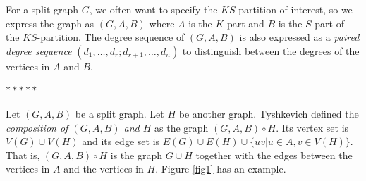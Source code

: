 \documentclass[11pt]{article}
\begin{document}
	For a split graph $G$, we often want to specify the $KS$-partition of interest,  so we express the graph as $(G,A, B)$ where $A$ is the $K$-part and $B$ is the $S$-part of the $KS$-partition.  The degree sequence of $(G,A,B)$ is also expressed as a {\it paired degree sequence} $(d_1, \hdots, d_r; d_{r+1}, \hdots, d_n)$ to distinguish between the degrees of the vertices in $A$ and $B$. 
	
	
	
	
	
\medskip	
\bigskip %
\centerline{$*  *  *  * *$}
\bigskip %
\medskip


	
	
	
	Let $(G,A,B)$ be a split graph.  Let $H$ be another graph.  Tyshkevich defined the {\it composition of $(G,A,B)$ and $H$} as the graph $(G,A,B) \circ H$. Its vertex set is $V(G) \cup V(H)$ and its edge set is $E(G) \cup E(H) \cup \{uv|u \in A, v \in V(H)\}$.   That is,  $(G,A,B) \circ H$  is the graph $G \cup H$ together with the edges between the vertices in $A$ and the vertices in $H$.  Figure \ref{fig1} has an example.  
	
\end{document}
